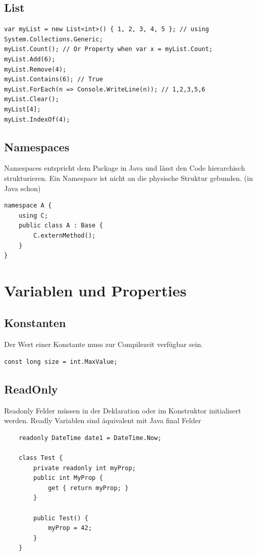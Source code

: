 \subsection{List}
\begin{lstlisting}
var myList = new List<int>() { 1, 2, 3, 4, 5 }; // using System.Collections.Generic;
myList.Count(); // Or Property when var x = myList.Count;
myList.Add(6);
myList.Remove(4);
myList.Contains(6); // True
myList.ForEach(n => Console.WriteLine(n)); // 1,2,3,5,6
myList.Clear();
myList[4];
myList.IndexOf(4);
\end{lstlisting}


\subsection{Namespaces}
Namespaces entspricht dem Package in Java und lässt den Code hierarchisch strukturieren. Ein Namespace ist nicht an die physische Struktur gebunden. (in Java schon)
\begin{lstlisting}
namespace A {
	using C;
	public class A : Base {
		C.externMethod();
	}
}
\end{lstlisting}

\section{Variablen und Properties}
\subsection{Konstanten}
Der Wert einer Konstante muss zur Compilezeit verfügbar sein.
\begin{lstlisting}
const long size = int.MaxValue;
\end{lstlisting}

\subsection{ReadOnly}
Readonly Felder müssen in der Deklaration oder im Konstruktor initialisert werden. Readly Variablen sind äquivalent mit Java final Felder
\begin{lstlisting}
	readonly DateTime date1 = DateTime.Now;
	
	class Test {
		private readonly int myProp;
		public int MyProp {
			get { return myProp; }
		}
		
		public Test() {
			myProp = 42;
		}
	}
\end{lstlisting}


